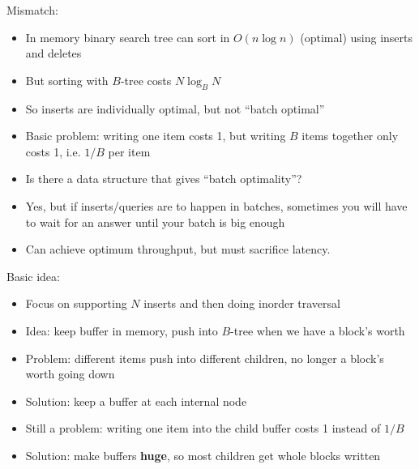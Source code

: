 \documentclass{article}
\begin{document}
Mismatch:
\begin{itemize}
\item In memory binary search tree can sort in $O(n\log n)$ (optimal)
using inserts and deletes
\item But sorting with $B$-tree costs $N\log_B N$
\item So inserts are individually optimal, but not ``batch optimal''
\item Basic problem: writing one item costs 1, but writing $B$ items
  together only costs 1, i.e. $1/B$ per item
\item Is there a data structure that gives ``batch optimality''?
\item Yes, but if inserts/queries are to happen in batches, sometimes
  you will have to wait for an answer until your batch is big enough
\item Can achieve optimum throughput,  but must sacrifice latency.
\end{itemize}

Basic idea:
\begin{itemize}
\item Focus on supporting $N$ inserts and then doing inorder traversal
\item Idea: keep buffer in memory, push into $B$-tree when we have a
  block's worth
\item Problem: different items push into different children, no longer
  a block's worth going down
\item Solution: keep a buffer at each internal node
\item Still a problem: writing one item into the child buffer costs 1
  instead of $1/B$
\item Solution: make buffers \textbf{huge}, so most children get whole
  blocks written
\end{itemize}
\end{document}
